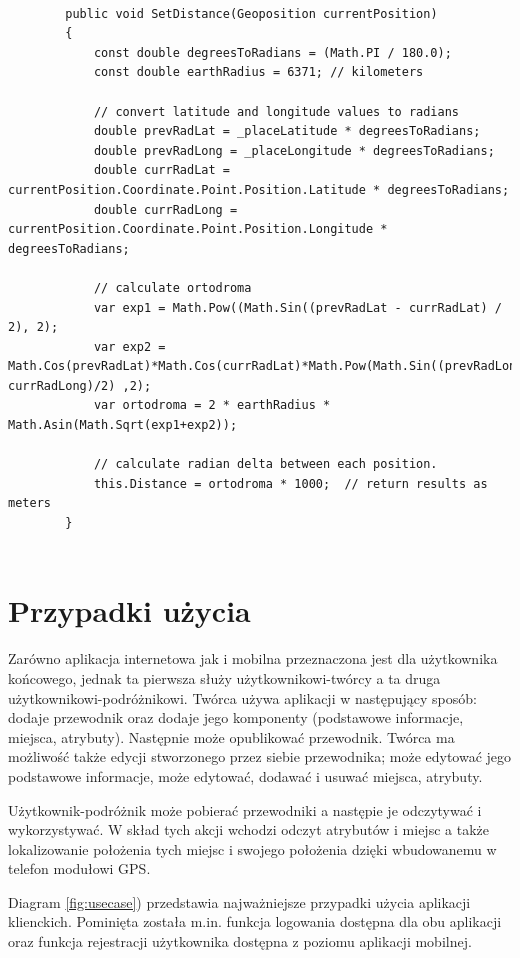\documentclass[a4paper]{book}
\begin{document}
		\begin{lstlisting}[label={lst:haversin},caption=Funkcja obliczająca dystans pomiędzy pozycją użytkownika a punktem na mapie]
		
		public void SetDistance(Geoposition currentPosition)
		{
			const double degreesToRadians = (Math.PI / 180.0);
			const double earthRadius = 6371; // kilometers
			
			// convert latitude and longitude values to radians
			double prevRadLat = _placeLatitude * degreesToRadians;
			double prevRadLong = _placeLongitude * degreesToRadians;
			double currRadLat = currentPosition.Coordinate.Point.Position.Latitude * degreesToRadians;
			double currRadLong = currentPosition.Coordinate.Point.Position.Longitude * degreesToRadians;
			
			// calculate ortodroma
			var exp1 = Math.Pow((Math.Sin((prevRadLat - currRadLat) / 2), 2);
			var exp2 = Math.Cos(prevRadLat)*Math.Cos(currRadLat)*Math.Pow(Math.Sin((prevRadLong-currRadLong)/2) ,2);
			var ortodroma = 2 * earthRadius * Math.Asin(Math.Sqrt(exp1+exp2));
			
			// calculate radian delta between each position.            
			this.Distance = ortodroma * 1000;  // return results as meters
		}
		
		\end{lstlisting}


		\section{Przypadki użycia}
		\label{id:sec:przypadki_uzycia}
		Zarówno aplikacja internetowa jak i mobilna przeznaczona jest dla użytkownika końcowego, jednak ta pierwsza służy użytkownikowi-twórcy a ta druga użytkownikowi-podróżnikowi. Twórca używa aplikacji w następujący sposób: dodaje przewodnik oraz dodaje jego komponenty (podstawowe informacje, miejsca, atrybuty). Następnie może opublikować przewodnik. Twórca ma możliwość także edycji stworzonego przez siebie przewodnika; może edytować jego podstawowe informacje, może edytować, dodawać i usuwać miejsca, atrybuty. 
		
		Użytkownik-podróżnik może pobierać przewodniki a następie je odczytywać i wykorzystywać. W skład tych akcji wchodzi odczyt atrybutów i miejsc a także lokalizowanie położenia tych miejsc i swojego położenia dzięki wbudowanemu w telefon modułowi GPS.  
		 
		Diagram \ref{fig:usecase}) przedstawia najważniejsze przypadki użycia aplikacji klienckich. Pominięta została m.in. funkcja logowania dostępna dla obu aplikacji oraz funkcja rejestracji użytkownika dostępna z poziomu aplikacji mobilnej.			
		
\end{document}
